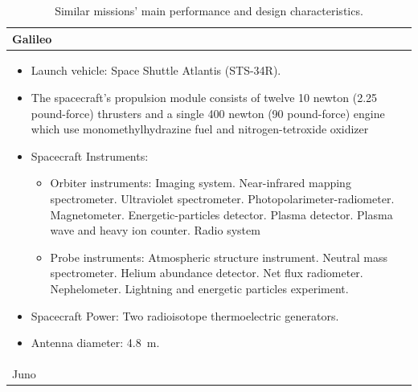 \begin{longtable}{p{}}
  \caption{Similar missions' main performance and design
    characteristics.} \\

  Galileo \\* \midrule

  \begin{itemize}
  \item Launch vehicle: Space Shuttle Atlantis (STS-34R).
  \item The spacecraft's propulsion module consists of twelve 10
    newton (2.25 pound-force) thrusters and a single 400 newton (90
    pound-force) engine which use monomethylhydrazine fuel and
    nitrogen-tetroxide oxidizer
  \item Spacecraft Instruments:
    \begin{itemize}
    \item Orbiter instruments:
      Imaging system.
      Near-inf\-ra\-red mapping spectrometer.
      Ultraviolet spectrometer.
      Pho\-to\-po\-la\-ri\-me\-ter-radiometer.
      Magnetometer.
      E\-ner\-ge\-tic-par\-tic\-les detector.
      Plasma detector.
      Plasma wave and heavy ion counter. Radio system
    \item Probe instruments: Atmospheric structure instrument.
      Neutral mass spectrometer. Helium abundance detector. Net flux
      radiometer. Nephelometer. Lightning and energetic particles
      experiment.
    \end{itemize}
  \item Spacecraft Power: Two radioisotope thermoelectric generators.
  \item Antenna diameter: \SI{4.8}{m}.
  \end{itemize} \\ \pagebreak

  Juno \\* \midrule


\end{longtable}

